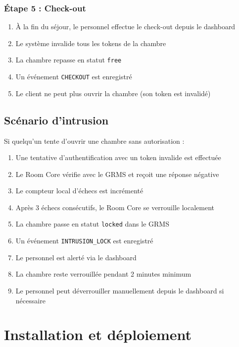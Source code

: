 \documentclass[11pt,a4paper]{article}
\begin{document}
\subsubsection{Étape 5 : Check-out}

\begin{enumerate}
    \item À la fin du séjour, le personnel effectue le check-out depuis le dashboard
    \item Le système invalide tous les tokens de la chambre
    \item La chambre repasse en statut \texttt{free}
    \item Un événement \texttt{CHECKOUT} est enregistré
    \item Le client ne peut plus ouvrir la chambre (son token est invalidé)
\end{enumerate}

\subsection{Scénario d'intrusion}

Si quelqu'un tente d'ouvrir une chambre sans autorisation :

\begin{enumerate}
    \item Une tentative d'authentification avec un token invalide est effectuée
    \item Le Room Core vérifie avec le GRMS et reçoit une réponse négative
    \item Le compteur local d'échecs est incrémenté
    \item Après 3 échecs consécutifs, le Room Core se verrouille localement
    \item La chambre passe en statut \texttt{locked} dans le GRMS
    \item Un événement \texttt{INTRUSION\_LOCK} est enregistré
    \item Le personnel est alerté via le dashboard
    \item La chambre reste verrouillée pendant 2 minutes minimum
    \item Le personnel peut déverrouiller manuellement depuis le dashboard si nécessaire
\end{enumerate}

\section{Installation et déploiement}
\end{document}

